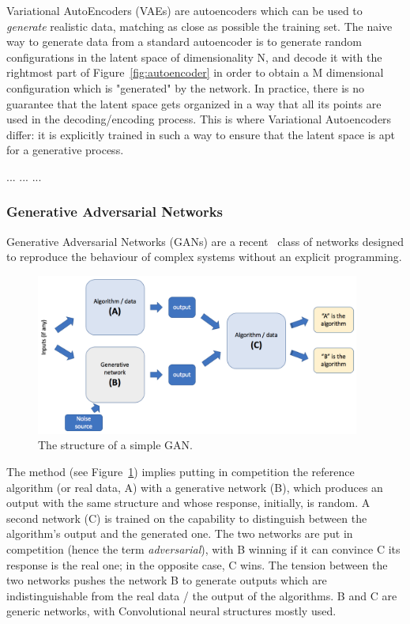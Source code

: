 Variational AutoEncoders (VAEs) are autoencoders which can be used to \emph{generate} realistic data, matching as close as possible the  training set. The naive way to generate data from a standard autoencoder is to generate random configurations in the latent space of dimensionality N, and decode it with the rightmost part of Figure~\ref{fig:autoencoder} in order to obtain a M dimensional configuration which is "generated" by the network. In practice, there is no guarantee that the latent space gets organized in a way that all its points are used in the decoding/encoding process. This is where Variational Autoencoders differ: it is explicitly trained in such a way to ensure that the latent space is apt for a generative process.

...
...
...

\subsubsection{Generative Adversarial Networks}
Generative Adversarial Networks (GANs) are a recent~\cite{goodfellow} class of networks designed to reproduce the behaviour of complex systems without an explicit programming.

\begin{figure}[h]
     \centering
     \includegraphics[width=0.95\textwidth]{images/gan.png}
     \caption{The structure of a simple GAN.}
     \label{fig:gan}
 \end{figure}

The method (see Figure~\ref{fig:gan}) implies putting in competition the reference algorithm (or real data, A) with a generative network (B), which produces an output with the same structure and whose response, initially, is random. A second network (C) is trained on the capability to distinguish between the algorithm's output and the generated one. The two networks are put in competition (hence the term \emph{adversarial}), with B winning if it can convince C its response is the real one; in the opposite case, C wins.
The tension between the two networks pushes the network B to generate outputs which are indistinguishable from the real data / the output of the  algorithms. B and C are generic networks, with Convolutional neural structures mostly used.

